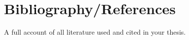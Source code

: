 
	\chapter{Bibliography/References}
	A full account of all literature used and cited in your thesis.
